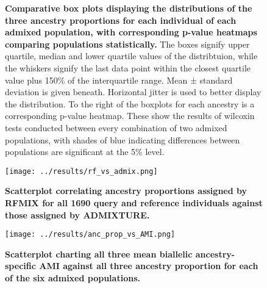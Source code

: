 \documentclass[11pt]{article}
\begin{document}
\begin{figure}[htb!]%
    \centering
     \hspace*{0em}
        \vspace{-0.6cm}
        \caption{\textbf{
            Comparative box plots displaying the distributions of the three ancestry proportions for each individual of each admixed population, with corresponding p-value heatmaps comparing populations statistically.
        }
            The boxes signify upper quartile, median and lower quartile values of the distribtuion, while the whiskers signify the last data point within the closest quartile value plus 150\% of the interquartile range. Mean ± standard deviation is given beneath. Horizontal jitter is used to better display the distribution. To the right of the boxplots for each ancestry is a corresponding p-value heatmap. These show the results of wilcoxin tests conducted between every combination of two admixed populations, with shades of blue indicating differences between populations are significant at the 5\% level.
        }
\end{figure}




\begin{figure}[htb!]%
    \centering
    \texttt{[image: ../results/rf\_vs\_admix.png]} 
    \vspace{.2cm}
    \caption{\textbf{
        Scatterplot correlating ancestry proportions assigned by RFMIX for all 1690 query and reference individuals against those assigned by ADMIXTURE.
    }
    }
\end{figure}




\begin{figure}[htb!]%
    \centering
    \texttt{[image: ../results/anc\_prop\_vs\_AMI.png]} 
    \vspace{.2cm}
    \caption{\textbf{
        Scatterplot charting all three mean biallelic ancestry-specific AMI against all three ancestry proportion for each of the six admixed populations.
    }
    }
\end{figure}
\end{document}
